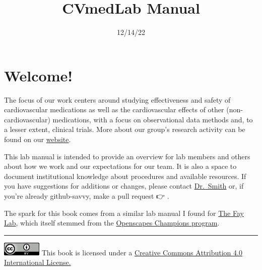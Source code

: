 \documentclass[
  letterpaper,
  DIV=11,
  numbers=noendperiod]{scrreprt}
\title{CVmedLab Manual}
\author{}
\date{12/14/22}
\renewcommand*\contentsname{Table of contents}
\newcommand\contentsname{Table of contents}
\begin{document}
\maketitle
\ifdefined\Shaded\renewenvironment{Shaded}{\begin{tcolorbox}[borderline west={3pt}{0pt}{shadecolor}, breakable, enhanced, sharp corners, frame hidden, boxrule=0pt, interior hidden]}{\end{tcolorbox}}\fi

\renewcommand*\contentsname{Table of contents}
{
\hypersetup{linkcolor=}
\setcounter{tocdepth}{2}
\tableofcontents
}

\hypertarget{sec-welcome}{%
\chapter{Welcome!}\label{sec-welcome}}

The focus of our work centers around studying effectiveness and safety
of cardiovascular medications as well as the cardiovascular effects of
other (non-cardiovascular) medications, with a focus on observational
data methods and, to a lesser extent, clinical trials. More about our
group's research activity can be found on our
\href{https://cvmedlab.github.io/}{website}.

This lab manual is intended to provide an overview for lab members and
others about how we work and our expectations for our team. It is also a
space to document institutional knowledge about procedures and available
resources. If you have suggestions for additions or changes, please
contact \href{mailto:ssmith@cop.ufl.edu}{Dr.~Smith} or, if you're
already github-savvy, make a pull request 👉
\href{https://github.com/cvmedlab/cvmedlab_manual/}{}.

The spark for this book comes from a similar lab manual I found for
\href{https://github.com/thefaylab/lab-manual}{The Fay Lab}, which
itself stemmed from the \href{https://openscapes.org}{Openscapes
Champions program}.

\begin{center}\rule{0.5\linewidth}{0.5pt}\end{center}

\href{http://creativecommons.org/licenses/by/4.0/}{\includegraphics[width=0.72917in,height=0.26042in]{./assets/creative_commons.png}}
This book is licensed under a
\href{http://creativecommons.org/licenses/by/4.0/}{Creative Commons
Attribution 4.0 International License.}
\end{document}
